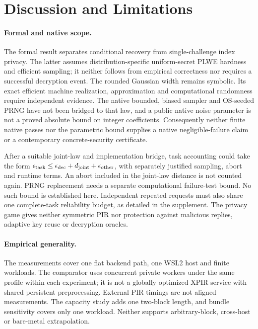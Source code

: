 \section{Discussion and Limitations}
\label{sec:discussion}
\paragraph{Formal and native scope.}
The formal result separates conditional recovery from single-challenge
index privacy. The latter assumes distribution-specific uniform-secret
PLWE hardness and efficient sampling; it neither follows from empirical
correctness nor requires a successful decryption event. The rounded
Gaussian width remains symbolic. Its exact efficient machine realization,
approximation and computational randomness require independent evidence.
The native bounded, biased sampler and OS-seeded PRNG have not been
bridged to that law, and a public native noise parameter is not a proved
absolute bound on integer coefficients. Consequently neither finite
native passes nor the parametric bound supplies a native negligible-failure
claim or a contemporary concrete-security certificate.

After a suitable joint-law and implementation bridge, task accounting
could take the form
\(\epsilon_{\rm task}\le\epsilon_{\rm dec}+d_{\rm joint}
+\epsilon_{\rm other}\), with separately justified sampling, abort and
runtime terms. An abort included in the joint-law distance is not counted
again. PRNG replacement needs a separate computational failure-test bound.
No such bound is established here. Independent repeated requests must
also share one complete-task reliability budget, as detailed in the
supplement. The privacy game gives neither symmetric PIR nor protection
against malicious replies, adaptive key reuse or decryption oracles.

\paragraph{Empirical generality.}
The measurements cover one flat backend path, one WSL2 host and finite
workloads. The comparator uses concurrent private workers under the same
profile within each experiment; it is not a globally optimized XPIR
service with shared persistent preprocessing. External PIR timings are
not aligned measurements. The capacity study adds one two-block length,
and bundle sensitivity covers only one workload. Neither supports
arbitrary-block, cross-host or bare-metal extrapolation.

